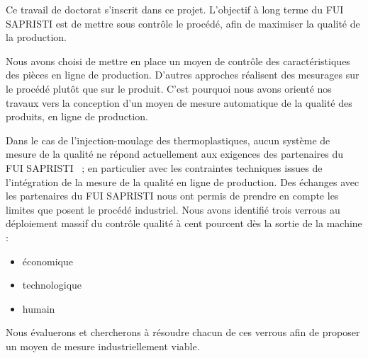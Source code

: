 Ce travail de doctorat s'inscrit dans ce projet.
L'objectif à long terme du FUI SAPRISTI est de mettre sous contrôle le procédé, afin de maximiser la qualité de la production.

Nous avons choisi de mettre en place un moyen de contrôle des caractéristiques des pièces en ligne de production.
D'autres approches réalisent des mesurages sur le procédé plutôt que sur le produit.
C'est pourquoi nous avons orienté nos travaux vers la conception d'un moyen de mesure automatique de la qualité des produits, en ligne de production.

Dans le cas de l’injection-moulage des thermoplastiques, aucun système de mesure de la qualité ne répond actuellement aux exigences des partenaires du FUI SAPRISTI \ ; en particulier avec les contraintes techniques issues de l'intégration de la mesure de la qualité en ligne de production.
Des échanges avec les partenaires du FUI SAPRISTI nous ont permis de prendre en compte les limites que posent le procédé industriel.
Nous avons identifié trois verrous au déploiement massif du contrôle qualité à cent pourcent dès la sortie de la machine :
\begin{itemize}
	\item économique
	\item technologique
	\item humain
\end{itemize}
Nous évaluerons et chercherons à résoudre chacun de ces verrous afin de proposer un moyen de mesure industriellement viable.

\bigskip

